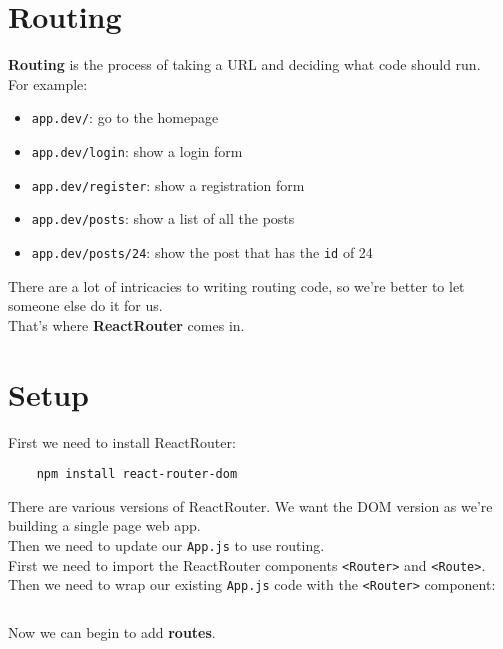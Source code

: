 \section{Routing}

\textbf{Routing} is the process of taking a URL and deciding what code should run.
\\

For example:

\begin{itemize}
    \item \texttt{app.dev/}: go to the homepage
    \item \texttt{app.dev/login}: show a login form
    \item \texttt{app.dev/register}: show a registration form
    \item \texttt{app.dev/posts}: show a list of all the posts
    \item \texttt{app.dev/posts/24}: show the post that has the \texttt{id} of 24
\end{itemize}

There are a lot of intricacies to writing routing code, so we're better to let someone else do it for us.
\\

That's where \textbf{ReactRouter} comes in.



\section{Setup}

First we need to install ReactRouter:

\begin{verbatim}
    npm install react-router-dom
\end{verbatim}

There are various versions of ReactRouter. We want the DOM version as we're building a single page web app.
\\

Then we need to update our \texttt{App.js} to use routing.
\\

First we need to import the ReactRouter components \texttt{<Router>} and \texttt{<Route>}. Then we need to wrap our existing \texttt{App.js} code with the \texttt{<Router>} component:

\inputminted{jsx}{06-router/figures/01-Router.jsx}

Now we can begin to add \textbf{routes}.


